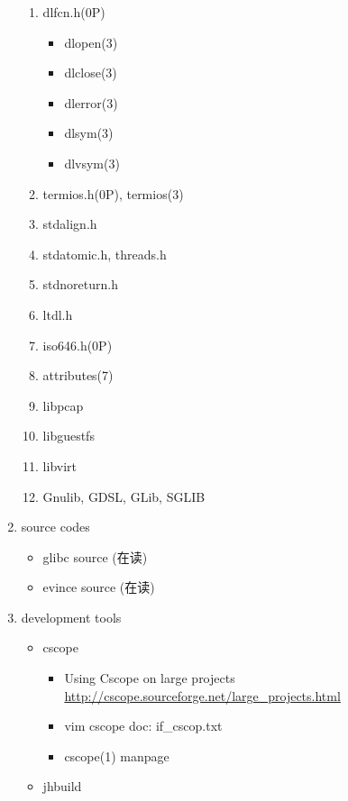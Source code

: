 \documentclass{article}
\begin{document}
\begin{enumerate}
\begin{enumerate}
            \item dlfcn.h(0P)
                \begin{itemize}
                    \item dlopen(3)
                    \item dlclose(3)
                    \item dlerror(3)
                    \item dlsym(3)
                    \item dlvsym(3)
                \end{itemize}
            \item termios.h(0P), termios(3)
            \item stdalign.h
            \item stdatomic.h, threads.h
            \item stdnoreturn.h
            \item ltdl.h
            \item iso646.h(0P)
            \item attributes(7)
            \item libpcap
            \item libguestfs
            \item libvirt
            \item Gnulib, GDSL, GLib, SGLIB
        \end{enumerate}
    \item source codes
        \begin{itemize}
            \item glibc source (在读)
            \item evince source (在读)
        \end{itemize}
    \item development tools
        \begin{itemize}
            \item cscope
                \begin{itemize}
                    \item Using Cscope on large projects \url{http://cscope.sourceforge.net/large_projects.html}
                    \item vim cscope doc: if_cscop.txt
                    \item cscope(1) manpage
                \end{itemize}
            \item jhbuild
        \end{itemize}
\end{enumerate}
\end{document}
